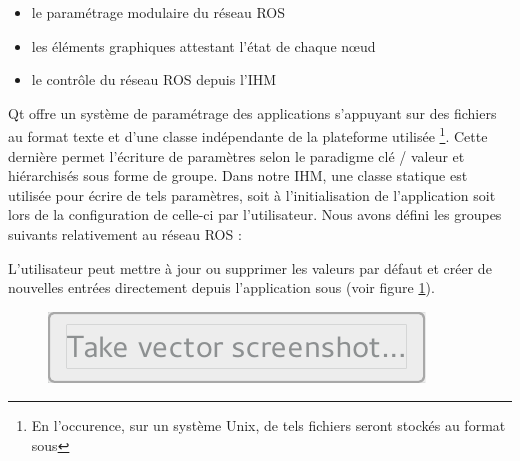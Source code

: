 \begin{itemize}
  \item le paramétrage modulaire du réseau ROS
  \item les éléments graphiques attestant l'état de chaque n\oe{}ud
  \item le contrôle du réseau ROS depuis l'IHM
\end{itemize}

Qt offre un système de paramétrage des applications s'appuyant sur des fichiers au format texte et d'une classe  indépendante de la plateforme utilisée
\footnote{En l'occurence, sur un système Unix, de tels fichiers seront stockés au format  sous }.
Cette dernière permet l'écriture de paramètres selon le paradigme clé / valeur et hiérarchisés sous forme de groupe.  
Dans notre IHM, une classe statique  est utilisée pour écrire de tels paramètres, soit à l'initialisation de l'application soit lors de la configuration de celle-ci par l'utilisateur. 
Nous avons défini les groupes suivants relativement au réseau ROS :

\renewcommand*\DTstylecomment{\rmfamily\color{red}}

L'utilisateur peut mettre à jour ou supprimer les valeurs par défaut et créer de nouvelles entrées directement depuis l'application sous  (voir figure \ref{fig:settings}).

\begin{figure}[h]
  \centering
    \includegraphics[width=.7\linewidth]{figures/settings}  
  \label{fig:settings}
\end{figure}

